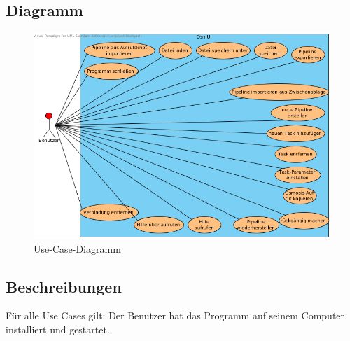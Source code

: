 \documentclass[a4paper,12pt]{scrartcl}
\begin{document}
\subsection{Diagramm}
\begin{center}
\begin{figure}[h!]
\begin{center}
\includegraphics[width=15cm]{Use-Cases.png}
\caption{Use-Case-Diagramm}
\end{center}
\end{figure}
\end{center}
\newpage
\subsection{Beschreibungen}
Für alle Use Cases gilt: Der Benutzer hat das Programm auf seinem Computer installiert und gestartet.
\end{document}
